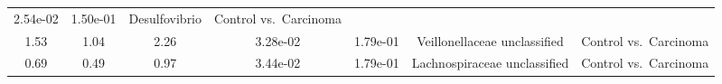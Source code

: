 \documentclass[12pt,]{article}
\begin{document}
\begin{longtable}[]{@{}ccccccc@{}}
\begin{minipage}[t]{0.08\columnwidth}
2.54e-02\strut
\end{minipage} & \begin{minipage}[t]{0.08\columnwidth}\centering\strut
1.50e-01\strut
\end{minipage} & \begin{minipage}[t]{0.23\columnwidth}\centering\strut
Desulfovibrio\strut
\end{minipage} & \begin{minipage}[t]{0.16\columnwidth}\centering\strut
Control vs.~Carcinoma\strut
\end{minipage}\tabularnewline
\begin{minipage}[t]{0.06\columnwidth}\centering\strut
1.53\strut
\end{minipage} & \begin{minipage}[t]{0.10\columnwidth}\centering\strut
1.04\strut
\end{minipage} & \begin{minipage}[t]{0.10\columnwidth}\centering\strut
2.26\strut
\end{minipage} & \begin{minipage}[t]{0.08\columnwidth}\centering\strut
3.28e-02\strut
\end{minipage} & \begin{minipage}[t]{0.08\columnwidth}\centering\strut
1.79e-01\strut
\end{minipage} & \begin{minipage}[t]{0.23\columnwidth}\centering\strut
Veillonellaceae unclassified\strut
\end{minipage} & \begin{minipage}[t]{0.16\columnwidth}\centering\strut
Control vs.~Carcinoma\strut
\end{minipage}\tabularnewline
\begin{minipage}[t]{0.06\columnwidth}\centering\strut
0.69\strut
\end{minipage} & \begin{minipage}[t]{0.10\columnwidth}\centering\strut
0.49\strut
\end{minipage} & \begin{minipage}[t]{0.10\columnwidth}\centering\strut
0.97\strut
\end{minipage} & \begin{minipage}[t]{0.08\columnwidth}\centering\strut
3.44e-02\strut
\end{minipage} & \begin{minipage}[t]{0.08\columnwidth}\centering\strut
1.79e-01\strut
\end{minipage} & \begin{minipage}[t]{0.23\columnwidth}\centering\strut
Lachnospiraceae unclassified\strut
\end{minipage} & \begin{minipage}[t]{0.16\columnwidth}\centering\strut
Control vs.~Carcinoma\strut
\end{minipage}\tabularnewline
\bottomrule
\end{longtable}
\end{document}

